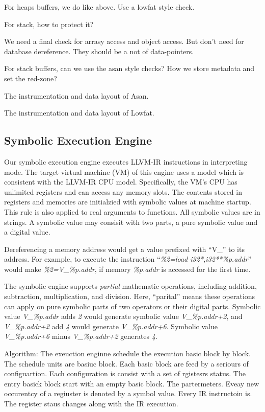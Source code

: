For heaps buffers, we do like above. Use a lowfat style check.

For stack, how to protect it?

We need a final check for arrasy access and object access.
But don't need for database dereference.
They should be a not of data-pointers.


For stack buffers, can we use the asan style checks?
How we store metadata and set the red-zone?


The instrumentation and data layout of Asan.

The instrumentation and data layout of Lowfat.

\subsection{Symbolic Execution Engine}

Our symbolic execution engine executes LLVM-IR instructions in interpreting mode.
The target virtual machine (VM) of this engine uses a model which is consistent with the LLVM-IR CPU model.
Specifically, the VM's CPU has unlimited registers and can access any memory slots.
The contents stored in registers and memories are initialzied with symbolic values at machine startup.
This rule is also applied to real arguments to functions.
All symbolic values are in strings. A symbolic value may consisit with two parts, a pure symbolic value and a digital value.


Dereferencing a memory address would get a value prefixed with ``V\_'' to its address.
For example, to execute the instruction
``\textit{\%2=load i32*,i32**\%p.addr}'' would make \textit{\%2=V\_\%p.addr}, if memory \textit{\%p.addr} is accessed for the first time.


The symbolic engine supports \textit{partial} mathematic operations, including addition, subtraction, multiplication, and division.
Here, ``parital'' means these operations can apply on pure symbolic parts of two operators or their digital parts.
Symbolic value \textit{V\_\%p.addr} adds \textit{2} would generate symbolic value \textit{V\_\%p.addr+2},
and \textit{V\_\%p.addr+2} add \textit{4} would generate \textit{V\_\%p.addr+6}.
Symbolic value \textit{V\_\%p.addr+6} minus \textit{V\_\%p.addr+2} generates \textit{4}.

Algorithm:
The exeuction enginne schedule the execution basic block by block.
The schedule units are basiuc block.
Each basic block are feed by a seriours of configuartion.
Each configuration is consist with a set of rgistesrs status.
The entry basick block start with an empty basic block.
The partermeters.
Eveay new occurentcy of a regiuster is denoted by a symbol value.
Every IR instructoin is.
The register staus changes along with the IR execution.

